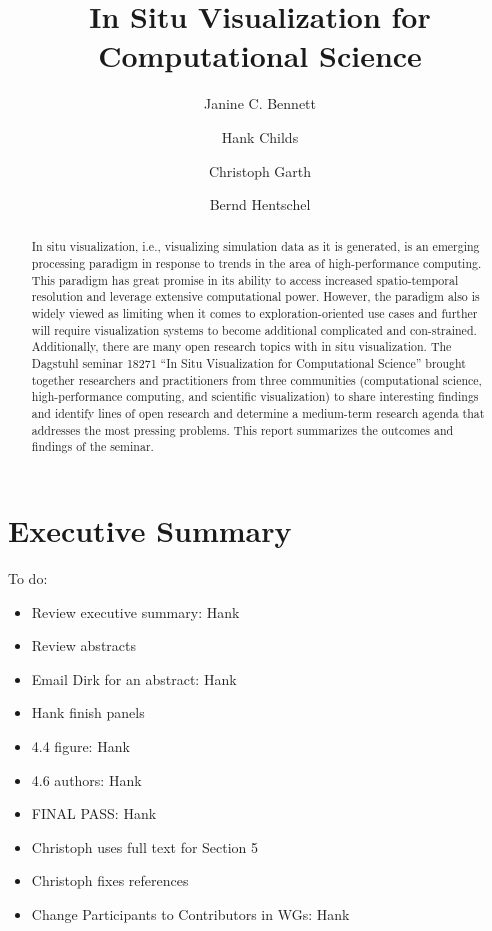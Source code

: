 \documentclass[a4paper,UKenglish]{dagrep}
\title{In Situ Visualization for Computational Science}
\author[1]{Janine C. Bennett}
\author[2]{Hank Childs}
\author[3]{Christoph Garth}
\author[4]{Bernd Hentschel}
\affil[1]{Sandia National Laboratories, Livermore}
\affil[2]{University of Oregon}
\affil[3]{Technische Universität Kaiserslautern}
\affil[4]{RWTH Aachen University}
\begin{document}
\maketitle

\begin{abstract}
In situ visualization, i.e., visualizing simulation data as it is generated, is an emerging processing paradigm in response to trends in the area of high-performance computing.  This paradigm has great promise in its ability to access increased spatio-temporal resolution and leverage extensive computational power.  However, the paradigm also is widely viewed as limiting when it comes to exploration-oriented use cases and further will require visualization systems to become additional complicated and con-strained.  Additionally, there are many open research topics with in situ visualization. The Dagstuhl seminar 18271 ``In Situ Visualization for Computational Science'' brought together researchers and practitioners from three communities (computational science, high-performance computing, and scientific visualization) to share interesting findings and identify lines of open research and determine a medium-term research agenda that addresses the most pressing problems. This report summarizes the outcomes and findings of the seminar.
\end{abstract}

\section{Executive Summary}

\license

To do:
\begin{itemize}
    \item Review executive summary: Hank
    \item Review abstracts
    \item Email Dirk for an abstract: Hank
    \item Hank finish panels
    \item 4.4 figure: Hank
    \item 4.6 authors: Hank
    \item FINAL PASS: Hank
    \item Christoph uses full text for Section 5
    \item Christoph fixes references
    \item Change Participants to Contributors in WGs: Hank
\end{itemize}
\end{document}
